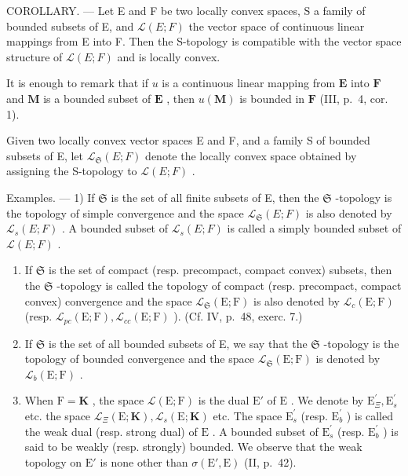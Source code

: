 COROLLARY. --- Let E and F be two locally convex spaces, S a family of bounded subsets of E, and \(\mathcal{L}(E; F)\) the vector space of continuous linear mappings from E into F. Then the S-topology is compatible with the vector space structure of \(\mathcal{L}(E; F)\) and is locally convex.

It is enough to remark that if \(u\) is a continuous linear mapping from \(\mathbf{E}\) into \(\mathbf{F}\) and \(\mathbf{M}\) is a bounded subset of \(\mathbf{E}\) , then \(u(\mathbf{M})\) is bounded in \(\mathbf{F}\) (III, p.~4, cor. 1).

Given two locally convex vector spaces E and F, and a family S of bounded subsets of E, let \(\mathcal{L}_{\mathfrak{S}}(E;F)\) denote the locally convex space obtained by assigning the S-topology to \(\mathcal{L}(E;F)\) .

Examples. --- 1) If \(\mathfrak{S}\) is the set of all finite subsets of E, then the \(\mathfrak{S}\) -topology is the topology of simple convergence and the space \(\mathcal{L}_{\mathfrak{S}}(E; F)\) is also denoted by \(\mathcal{L}_s(E; F)\) . A bounded subset of \(\mathcal{L}_s(E; F)\) is called a simply bounded subset of \(\mathcal{L}(E; F)\) .

\begin{enumerate}
\def\labelenumi{\arabic{enumi})}
\setcounter{enumi}{1}
\item
  If \(\mathfrak{S}\) is the set of compact (resp. precompact, compact convex) subsets, then the \(\mathfrak{S}\) -topology is called the topology of compact (resp. precompact, compact convex) convergence and the space \(\mathcal{L}_{\mathfrak{S}}(\mathrm{E};\mathrm{F})\) is also denoted by \(\mathcal{L}_c(\mathrm{E};\mathrm{F})\) (resp. \(\mathcal{L}_{pc}(\mathrm{E};\mathrm{F}),\mathcal{L}_{cc}(\mathrm{E};\mathrm{F})\) ). (Cf. IV, p.~48, exerc. 7.)
\item
  If \(\mathfrak{S}\) is the set of all bounded subsets of E, we say that the \(\mathfrak{S}\) -topology is the topology of bounded convergence and the space \(\mathcal{L}_{\mathfrak{S}}(\mathrm{E};\mathrm{F})\) is denoted by \(\mathcal{L}_b(\mathrm{E};\mathrm{F})\) .
\item
  When \(\mathrm{F} = \mathbf{K}\) , the space \(\mathcal{L}(\mathrm{E};\mathrm{F})\) is the dual \(\mathrm{E}'\) of \(\mathrm{E}\) . We denote by \(\mathrm{E}_{\Xi}^{\prime}, \mathrm{E}_{s}^{\prime}\) etc. the space \(\mathcal{L}_{\Xi}(\mathrm{E};\mathbf{K}), \mathcal{L}_s(\mathrm{E};\mathbf{K})\) etc. The space \(\mathrm{E}_s^\prime\) (resp. \(\mathrm{E}_b^\prime\) ) is called the weak dual (resp. strong dual) of \(\mathrm{E}\) . A bounded subset of \(\mathrm{E}_s^\prime\) (resp. \(\mathrm{E}_b^\prime\) ) is said to be weakly (resp. strongly) bounded. We observe that the weak topology on \(\mathrm{E}'\) is none other than \(\sigma (\mathrm{E}',\mathrm{E})\) (II, p.~42).
\end{enumerate}

